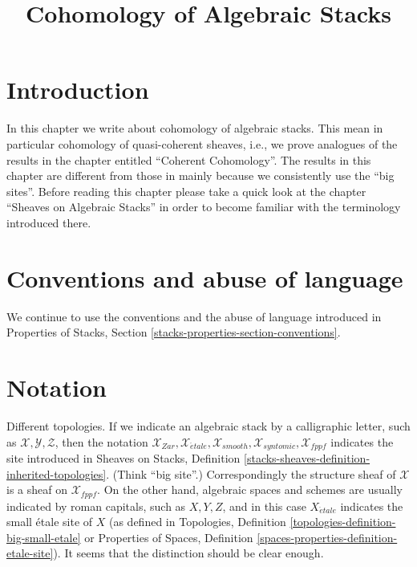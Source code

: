 

%


\title{Cohomology of Algebraic Stacks}

\maketitle

\label{section-phantom}

\tableofcontents




\section{Introduction}
\label{section-introduction}

\noindent
In this chapter we write about cohomology of algebraic stacks.
This mean in particular cohomology of quasi-coherent sheaves, i.e.,
we prove analogues of the results in the chapter entitled
``Coherent Cohomology''. The results in this chapter are different
from those in \cite{LM-B} mainly because we consistently use the
``big sites''. Before reading this chapter please take a quick look at
the chapter ``Sheaves on Algebraic Stacks'' in order to become
familiar with the terminology introduced there.



\section{Conventions and abuse of language}
\label{section-conventions}

\noindent
We continue to use the conventions and the abuse of language
introduced in
Properties of Stacks, Section \ref{stacks-properties-section-conventions}.











\section{Notation}
\label{section-notation}

\noindent
Different topologies. If we indicate an algebraic stack by a calligraphic
letter, such as $\mathcal{X}, \mathcal{Y}, \mathcal{Z}$, then the notation
$\mathcal{X}_{Zar}, \mathcal{X}_{\acute{e}tale}, \mathcal{X}_{smooth},
\mathcal{X}_{syntomic}, \mathcal{X}_{fppf}$ indicates the site introduced
in
Sheaves on Stacks, Definition
\ref{stacks-sheaves-definition-inherited-topologies}.
(Think ``big site''.) Correspondingly the structure sheaf of
$\mathcal{X}$ is a sheaf on $\mathcal{X}_{fppf}$.
On the other hand, algebraic spaces and schemes
are usually indicated by roman capitals, such as $X, Y, Z$, and in this case
$X_{\acute{e}tale}$ indicates the small \'etale site of $X$ (as
defined in
Topologies, Definition
\ref{topologies-definition-big-small-etale}
or
Properties of Spaces, Definition
\ref{spaces-properties-definition-etale-site}).
It seems that the distinction should be clear enough.

